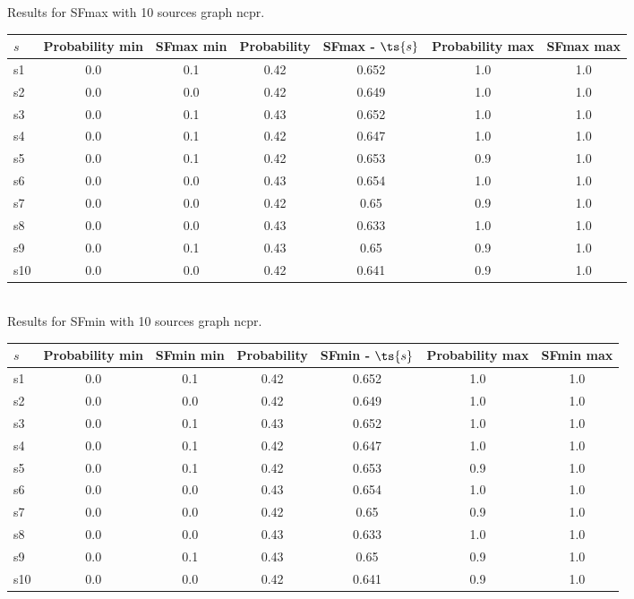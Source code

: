 \documentclass{article}
\begin{document}
\noindent Results for SFmax with 10 sources graph ncpr.

\noindent\begin{tabular}{|l|c|c|c|c|c|c|}
\hline
$s$& Probability min & SFmax min & Probability & SFmax - $\ts{s}$ & Probability max & SFmax max\\
\hline
s1 &0.0 & 0.1 & 0.42 & 0.652 & 1.0 & 1.0\\
\hline
s2 &0.0 & 0.0 & 0.42 & 0.649 & 1.0 & 1.0\\
\hline
s3 &0.0 & 0.1 & 0.43 & 0.652 & 1.0 & 1.0\\
\hline
s4 &0.0 & 0.1 & 0.42 & 0.647 & 1.0 & 1.0\\
\hline
s5 &0.0 & 0.1 & 0.42 & 0.653 & 0.9 & 1.0\\
\hline
s6 &0.0 & 0.0 & 0.43 & 0.654 & 1.0 & 1.0\\
\hline
s7 &0.0 & 0.0 & 0.42 & 0.65 & 0.9 & 1.0\\
\hline
s8 &0.0 & 0.0 & 0.43 & 0.633 & 1.0 & 1.0\\
\hline
s9 &0.0 & 0.1 & 0.43 & 0.65 & 0.9 & 1.0\\
\hline
s10 &0.0 & 0.0 & 0.42 & 0.641 & 0.9 & 1.0\\
\hline
\end{tabular}\\

\noindent Results for SFmin with 10 sources graph ncpr.

\noindent\begin{tabular}{|l|c|c|c|c|c|c|}
\hline
$s$& Probability min & SFmin min & Probability & SFmin - $\ts{s}$ & Probability max & SFmin max\\
\hline
s1 &0.0 & 0.1 & 0.42 & 0.652 & 1.0 & 1.0\\
\hline
s2 &0.0 & 0.0 & 0.42 & 0.649 & 1.0 & 1.0\\
\hline
s3 &0.0 & 0.1 & 0.43 & 0.652 & 1.0 & 1.0\\
\hline
s4 &0.0 & 0.1 & 0.42 & 0.647 & 1.0 & 1.0\\
\hline
s5 &0.0 & 0.1 & 0.42 & 0.653 & 0.9 & 1.0\\
\hline
s6 &0.0 & 0.0 & 0.43 & 0.654 & 1.0 & 1.0\\
\hline
s7 &0.0 & 0.0 & 0.42 & 0.65 & 0.9 & 1.0\\
\hline
s8 &0.0 & 0.0 & 0.43 & 0.633 & 1.0 & 1.0\\
\hline
s9 &0.0 & 0.1 & 0.43 & 0.65 & 0.9 & 1.0\\
\hline
s10 &0.0 & 0.0 & 0.42 & 0.641 & 0.9 & 1.0\\
\hline
\end{tabular}\\
\end{document}
